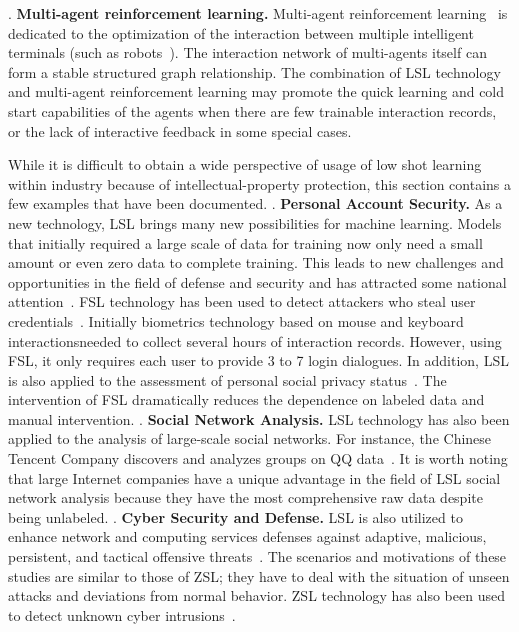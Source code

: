 \uppercase\expandafter{}. \textbf{Multi-agent reinforcement learning.} Multi-agent reinforcement learning~ is dedicated to the optimization of the interaction between multiple intelligent terminals (such as robots~). The interaction network of multi-agents itself can form a stable structured graph relationship. The combination of LSL technology and multi-agent reinforcement learning may promote the quick learning and cold start capabilities of the agents when there are few trainable interaction records, or the lack of interactive feedback in some special cases.

\label{sec7}

\label{sec7.1}
While it is difficult to obtain a wide perspective of usage of low shot learning within industry because of intellectual-property protection, this section contains a few examples that have been documented.
\uppercase\expandafter{}. \textbf{Personal Account Security.} As a new technology, LSL brings many new possibilities for machine learning. Models that initially required a large scale of data for training now only need a small amount or even zero data to complete training. This leads to new challenges and opportunities in the field of defense and security and has attracted some national attention~. FSL technology has been used to detect attackers who steal user credentials~. Initially biometrics technology based on mouse and keyboard interactionsneeded to collect several hours of interaction records. However, using FSL, it only requires each user to provide 3 to 7 login dialogues. In addition, LSL is also applied to the assessment of personal social privacy status~. The intervention of FSL dramatically reduces the dependence on labeled data and manual intervention.
\uppercase\expandafter{}. \textbf{Social Network Analysis.} LSL technology has also been applied to the analysis of large-scale social networks. For instance, the Chinese Tencent Company discovers and analyzes groups on QQ data~. It is worth noting that large Internet companies have a unique advantage in the field of LSL social network analysis because they have the most comprehensive raw data despite being unlabeled.
\uppercase\expandafter{}. \textbf{Cyber Security and Defense.} LSL is also utilized to enhance network and computing services defenses against adaptive, malicious, persistent, and tactical offensive threats~. The scenarios and motivations of these studies are similar to those of ZSL; they have to deal with the situation of unseen attacks and deviations from normal behavior. ZSL technology has also been used to detect unknown cyber intrusions~.
